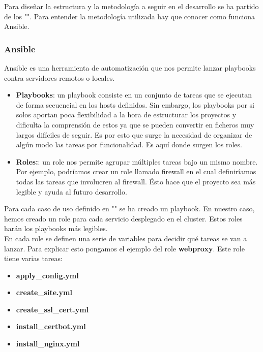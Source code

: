 \begin{text}
	Para diseñar la estructura y la metodología a seguir en el desarrollo se ha partido de los "". Para entender la metodología utilizada hay que conocer como funciona Ansible.
	
	\subsubsection{Ansible}
	\label{ansible_}
	\begin{text}
		Ansible es una herramienta de automatización que nos permite lanzar playbooks contra servidores remotos o locales.
		\begin{itemize}
			\item \textbf{Playbooks}: un playbook consiste en un conjunto de tareas que se ejecutan de forma secuencial en los hosts definidos. Sin embargo, los playbooks por si solos aportan poca flexibilidad a la hora de estructurar los proyectos y dificulta la comprensión de estos ya que se pueden convertir en ficheros muy largos difíciles de seguir. Es por esto que surge la necesidad de organizar de algún modo las tareas por funcionalidad. Es aquí donde surgen los roles.
			
			\item \textbf{Roles:}: un role nos permite agrupar múltiples tareas bajo un mismo nombre. Por ejemplo, podríamos crear un role llamado firewall en el cual definiríamos todas las tareas que involucren al firewall. Ésto hace que el proyecto sea más legible y ayuda al futuro desarrollo.
		\end{itemize}
	
	Para cada caso de uso definido en "" se ha creado un playbook. En nuestro caso, hemos creado un role para cada servicio desplegado en el cluster. Estos roles harán los playbooks más legibles. \\
	En cada role se definen una serie de variables para decidir qué tareas se van a lanzar. Para explicar esto pongamos el ejemplo del role \textbf{webproxy}. Este role tiene varias tareas:
	\begin{itemize}
		\item \textbf{apply\_config.yml}
		\item \textbf{create\_site.yml}
		\item \textbf{create\_ssl\_cert.yml}
		\item \textbf{install\_certbot.yml}
		\item \textbf{install\_nginx.yml}
	\end{itemize}


\end{text}
\end{text}
